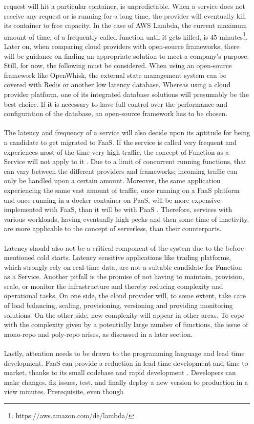 \documentclass[a4paper,twoside,11pt, pagesize]{scrartcl}
\begin{document}
request will hit a particular container, is unpredictable. When a service does not receive any request or is running for a long time, the provider will eventually kill its container to free capacity. In the case of AWS Lambda, the current maximum amount of time, of a frequently called function until it gets killed, is 45 minutes\footnote{https://aws.amazon.com/de/lambda/}. Later on, when comparing cloud providers with open-source frameworks, there will be guidance on finding an appropriate solution to meet a company's purpose. Still, for now, the following must be considered. When using an open-source framework like OpenWhisk, the external state management system can be covered with Redis or another low latency database. Whereas using a cloud provider platform, one of its integrated database solutions will presumably be the best choice. If it is necessary to have full control over the performance and configuration of the database, an open-source framework has to be chosen.\\\\ The latency and frequency of a service will also decide upon its aptitude for being a candidate to get migrated to FaaS. If the service is called very frequent and experiences most of the time very high traffic, the concept of Function as a Service will not apply to it \cite{jonas2019cloud}. Due to a limit of concurrent running functions, that can vary between the different providers and frameworks; incoming traffic can only be handled upon a certain amount. Moreover, the same application experiencing the same vast amount of traffic, once running on a FaaS platform and once running in a docker container on PaaS, will be more expensive implemented with FaaS, than it will be with PaaS \cite{jonas2019cloud}. Therefore, services with various workloads, having eventually high peeks and then some time of inactivity, are more applicable to the concept of serverless, than their counterparts.\\\\ Latency should also not be a critical component of the system due to the before mentioned cold starts. Latency sensitive applications like trading platforms, which strongly rely on real-time data, are not a suitable candidate for Function as a Service. Another pitfall is the promise of not having to maintain, provision, scale, or monitor the infrastructure and thereby reducing complexity and operational tasks. On one side, the cloud provider will, to some extent, take care of load balancing, scaling, provisioning, versioning and providing monitoring solutions. On the other side, new complexity will appear in other areas. To cope with the complexity given by a potentially large number of functions, the issue of mono-repo and poly-repo arises, as discussed in a later section.\\\\ Lastly, attention needs to be drawn to the programming language and lead time development. FaaS can provide a reduction in lead time development and time to market, thanks to its small codebase and rapid development \cite{sewak2018winning} \cite{leitner2019mixed}. Developers can make changes, fix issues, test, and finally deploy a new version to production in a view minutes. Prerequisite, even though 
\end{document}
